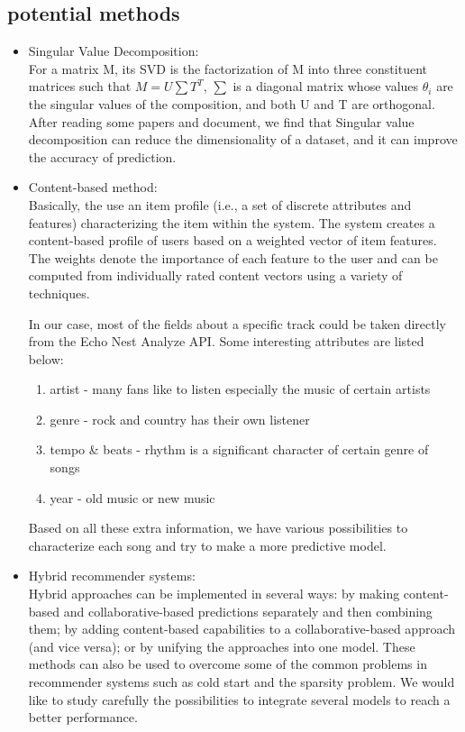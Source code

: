 \documentclass{article}
\begin{document}
\subsection{potential methods}
\begin{itemize}
\item Singular Value Decomposition:\\
For a matrix M, its SVD is the factorization of M into three constituent matrices such that $M = U\sum T^{T} $, $\sum$ is a diagonal matrix whose values $\theta_{i}$ are the singular values of the composition, and both U and T are orthogonal. After reading some papers and document, we find that Singular value decomposition can reduce the dimensionality of a dataset, and it can improve the accuracy of prediction.
\item Content-based method:\\
Basically, the use an item profile (i.e., a set of discrete attributes and features) characterizing the item within the system. The system creates a content-based profile of users based on a weighted vector of item features. The weights denote the importance of each feature to the user and can be computed from individually rated content vectors using a variety of techniques.

In our case, most of the fields about a specific track could be taken directly from the Echo Nest Analyze API. Some interesting attributes are listed below:
\begin{enumerate}
\item artist - many fans like to listen especially the music of certain artists
\item genre - rock and country has their own listener
\item tempo \& beats - rhythm is a significant character of certain genre of songs 
\item year - old music or new music
\end{enumerate}
Based on all these extra information, we have various possibilities to characterize each song and try to make a more predictive model.
\item Hybrid recommender systems:\\
Hybrid approaches can be implemented in several ways: by making content-based and collaborative-based predictions separately and then combining them; by adding content-based capabilities to a collaborative-based approach (and vice versa); or by unifying the approaches into one model. These methods can also be used to overcome some of the common problems in recommender systems such as cold start and the sparsity problem. We would like to study carefully the possibilities to integrate several models to reach a better performance.
\end{itemize}
\end{document}
